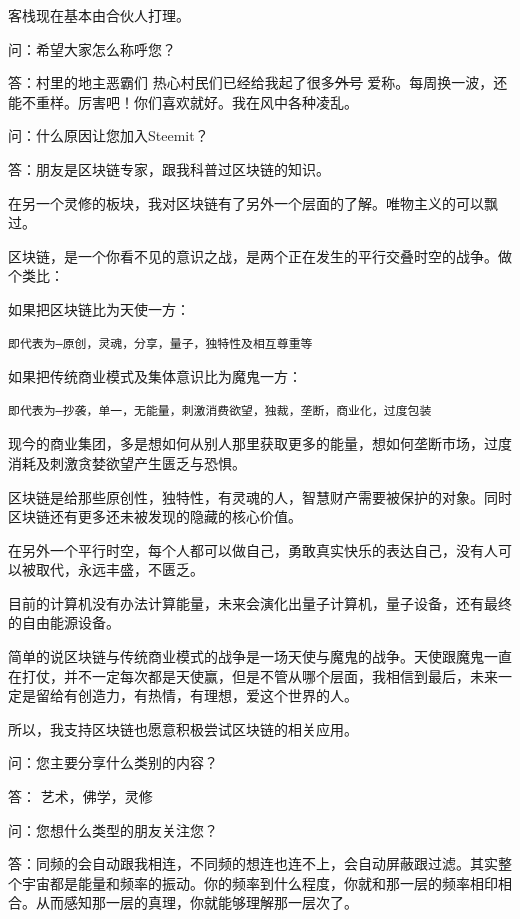 \documentclass[]{ctexbook}
\begin{document}
客栈现在基本由合伙人打理。

问：希望大家怎么称呼您？

答：村里的地主恶霸们 热心村民们已经给我起了很多\sout{外号} 爱称。每周换一波，还能不重样。厉害吧！你们喜欢就好。我在风中各种凌乱。

问：什么原因让您加入Steemit？

答：朋友是区块链专家，跟我科普过区块链的知识。

在另一个灵修的板块，我对区块链有了另外一个层面的了解。唯物主义的可以飘过。

区块链，是一个你看不见的意识之战，是两个正在发生的平行交叠时空的战争。做个类比：

如果把区块链比为天使一方：

\begin{verbatim}
即代表为—原创，灵魂，分享，量子，独特性及相互尊重等
\end{verbatim}

如果把传统商业模式及集体意识比为魔鬼一方：

\begin{verbatim}
即代表为—抄袭，单一，无能量，刺激消费欲望，独裁，垄断，商业化，过度包装
\end{verbatim}

现今的商业集团，多是想如何从别人那里获取更多的能量，想如何垄断市场，过度消耗及刺激贪婪欲望产生匮乏与恐惧。

区块链是给那些原创性，独特性，有灵魂的人，智慧财产需要被保护的对象。同时区块链还有更多还未被发现的隐藏的核心价值。

在另外一个平行时空，每个人都可以做自己，勇敢真实快乐的表达自己，没有人可以被取代，永远丰盛，不匮乏。

目前的计算机没有办法计算能量，未来会演化出量子计算机，量子设备，还有最终的自由能源设备。

简单的说区块链与传统商业模式的战争是一场天使与魔鬼的战争。天使跟魔鬼一直在打仗，并不一定每次都是天使赢，但是不管从哪个层面，我相信到最后，未来一定是留给有创造力，有热情，有理想，爱这个世界的人。

所以，我支持区块链也愿意积极尝试区块链的相关应用。

问：您主要分享什么类别的内容？

答： 艺术，佛学，灵修

问：您想什么类型的朋友关注您？

答：同频的会自动跟我相连，不同频的想连也连不上，会自动屏蔽跟过滤。其实整个宇宙都是能量和频率的振动。你的频率到什么程度，你就和那一层的频率相印相合。从而感知那一层的真理，你就能够理解那一层次了。
\end{document}

